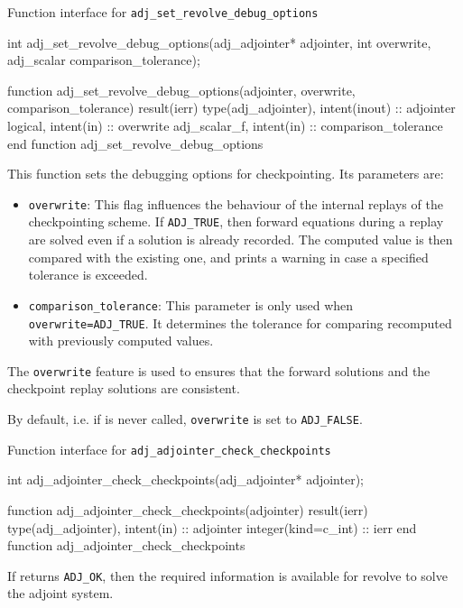 \begin{boxwithtitle}{Function interface for \texttt{adj_set_revolve_debug_options}}
\begin{minipage}{\columnwidth}
\begin{ccode}
int adj_set_revolve_debug_options(adj_adjointer* adjointer, int overwrite, 
                                  adj_scalar comparison_tolerance);
\end{ccode}
\begin{fortrancode}
function adj_set_revolve_debug_options(adjointer, overwrite, comparison_tolerance) 
                                      result(ierr)
  type(adj_adjointer), intent(inout) :: adjointer
  logical, intent(in) :: overwrite
  adj_scalar_f, intent(in) :: comparison_tolerance
end function adj_set_revolve_debug_options
\end{fortrancode}
\end{minipage}
\end{boxwithtitle}

This function sets the debugging options for checkpointing. Its parameters are: 
\begin{itemize}
\item \texttt{overwrite}: This flag influences the behaviour of the internal replays of the checkpointing scheme. If \texttt{ADJ_TRUE}, then forward equations during a replay are solved even if a solution is already recorded. The computed value is then compared with the existing one, and prints a warning in case a specified tolerance is exceeded.
\item \texttt{comparison_tolerance}: This parameter is only used when \texttt{overwrite=ADJ_TRUE}. It determines the tolerance for comparing recomputed with previously computed values.
\end{itemize}
The \texttt{overwrite} feature is used to ensures that the forward solutions and the checkpoint replay solutions are consistent.

By default, i.e. if  is never called, \texttt{overwrite} is set to \texttt{ADJ_FALSE}.

\begin{boxwithtitle}{Function interface for \texttt{adj_adjointer_check_checkpoints}}
\begin{minipage}{\columnwidth}
\begin{ccode}
int adj_adjointer_check_checkpoints(adj_adjointer* adjointer);
\end{ccode}
\begin{fortrancode}
function adj_adjointer_check_checkpoints(adjointer) result(ierr) 
  type(adj_adjointer), intent(in) :: adjointer
  integer(kind=c_int) :: ierr
end function adj_adjointer_check_checkpoints
\end{fortrancode}
\end{minipage}
\end{boxwithtitle}



If  returns \texttt{ADJ_OK}, then the required information is available for revolve to solve the adjoint system.
